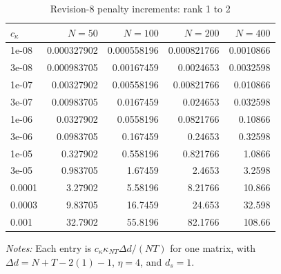 \begin{table}[!htbp]
\centering
\caption{Revision-8 penalty increments: rank 1 to 2}
\label{tab:ic-penalty-r1}
\begin{tabular}{lrrrr}
\toprule
$c_\kappa$ & $N=50$ & $N=100$ & $N=200$ & $N=400$ \\
\midrule
1e-08 & 0.000327902 & 0.000558196 & 0.000821766 & 0.0010866 \\
3e-08 & 0.000983705 & 0.00167459 & 0.0024653 & 0.0032598 \\
1e-07 & 0.00327902 & 0.00558196 & 0.00821766 & 0.010866 \\
3e-07 & 0.00983705 & 0.0167459 & 0.024653 & 0.032598 \\
1e-06 & 0.0327902 & 0.0558196 & 0.0821766 & 0.10866 \\
3e-06 & 0.0983705 & 0.167459 & 0.24653 & 0.32598 \\
1e-05 & 0.327902 & 0.558196 & 0.821766 & 1.0866 \\
3e-05 & 0.983705 & 1.67459 & 2.4653 & 3.2598 \\
0.0001 & 3.27902 & 5.58196 & 8.21766 & 10.866 \\
0.0003 & 9.83705 & 16.7459 & 24.653 & 32.598 \\
0.001 & 32.7902 & 55.8196 & 82.1766 & 108.66 \\
\bottomrule
\end{tabular}
\begin{minipage}{0.96\linewidth}\footnotesize \textit{Notes:} Each entry is $c_\kappa\kappa_{NT}\Delta d/(NT)$ for one matrix, with $\Delta d=N+T-2(1)-1$, $\eta=4$, and $d_s=1$.\end{minipage}
\end{table}

